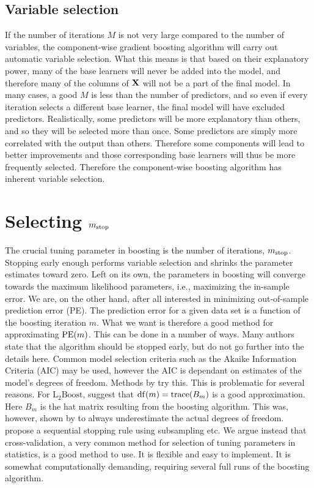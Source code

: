 \subsection{Variable selection}
If the number of iterations $M$ is not very large compared to the number of variables, the component-wise gradient boosting algorithm will carry out automatic variable selection. What this means is that based on their explanatory power, many of the base learners will never be added into the model, and therefore many of the columns of $\mathbf{X}$ will not be a part of the final model. In many cases, a good $M$ is less than the number of predictors, and so even if every iteration selects a different base learner, the final model will have excluded predictors. Realistically, some predictors will be more explanatory than others, and so they will be selected more than once. Some predictors are simply more correlated with the output than others. Therefore some components will lead to better improvements and those corresponding base learners will thus be more frequently selected. Therefore the component-wise boosting algorithm has inherent variable selection.

\section{Selecting $m_{\text{stop}}$}
The crucial tuning parameter in boosting is the number of iterations, $m_{\text{stop}}$. Stopping early enough performs variable selection and shrinks the parameter estimates toward zero. Left on its own, the parameters in boosting will converge towards the maximum likelihood parameters, i.e., maximizing the in-sample error. We are, on the other hand, after all interested in minimizing out-of-sample prediction error (PE). The prediction error for a given data set is a function of the boosting iteration $m$. What we want is therefore a good method for approximating $\operatorname{PE}(m)$. This can be done in a number of ways. Many authors state that the algorithm should be stopped early, but do not go further into the details here. Common model selection criteria such as the Akaike Information Criteria (AIC) may be used, however the AIC is dependant on estimates of the model's degrees of freedom. Methods by \citet{chang2010} try this. This is problematic for several reasons. For $\text{L}_2\text{Boost}$, \citet{buhlmann2007} suggest that $\operatorname{df}(m)=\operatorname{trace}(B_m)$ is a good approximation. Here $B_m$ is the hat matrix resulting from the boosting algorithm. This was, however, shown by \citet{hastie2007} to always underestimate the actual degrees of freedom. \citet{mayr-hofner} propose a sequential stopping rule using subsampling etc. We argue instead that cross-validation, a very common method for selection of tuning parameters in statistics, is a good method to use. It is flexible and easy to implement. It is somewhat computationally demanding, requiring several full runs of the boosting algorithm.


